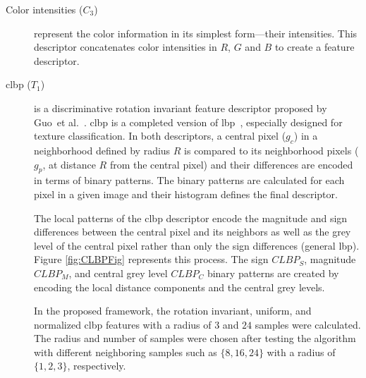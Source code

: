 \begin{description}
\item[Color intensities ($C_{3}$)] represent the color information in its simplest form---their intensities.
This descriptor concatenates color intensities in $R$, $G$ and $B$ to create a feature descriptor.
\item[\acf{clbp} ($T_{1}$)] is a discriminative rotation invariant feature descriptor proposed by Guo~et al.~\cite{guo2010completed}.
\ac{clbp} is a completed version of \ac{lbp}~\cite{ojala2002multiresolution}, especially designed for texture classification.
In both descriptors, a central pixel ($g_c$) in a neighborhood defined by radius $R$ is compared to its neighborhood pixels ($g_{p}$, at distance $R$ from the central pixel) and their differences are encoded in terms of binary patterns.
The binary patterns are calculated for each pixel in a given image and their histogram defines the final descriptor.
		
The local patterns of the \ac{clbp} descriptor encode the magnitude and sign differences between the central pixel and its neighbors as well as the grey level of the central pixel rather than only the sign differences (general \ac{lbp}).
Figure \ref{fig:CLBPFig} represents this process.
The sign $CLBP_S$, magnitude $CLBP_M$, and central grey level $CLBP_C$ binary patterns are created by encoding the local distance components and the central grey levels.  

In the proposed framework, the rotation invariant, uniform, and normalized \ac{clbp} features with a radius of 3 and $24$ samples were calculated.
The radius and number of samples were chosen after testing the algorithm with different neighboring samples such as $\{8, 16, 24\}$ with a radius of $\{1,2,3\}$, respectively.
\end{description}
